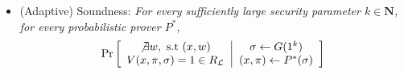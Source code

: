\documentclass{article}
\newcommand{\N}{{\mathbf N}}
\begin{document}
\begin{itemize}
    \item  (Adaptive) Soundness: \textit{For every sufficiently large security parameter $k \in \N$, for every probabilistic prover $P^*$,}
    $$\Pr\bigg[\begin{array}{c}\not \exists w, \text{ s.t } (x, w) \\ V(x, \pi, \sigma) = 1 \in R_{\mathcal{L}} \end{array} \bigg\vert \begin{array}{c} \sigma \leftarrow G(1^k) \\ (x, \pi) \leftarrow P^*(\sigma)\end{array}\bigg]$$
\end{itemize}
\end{document}
